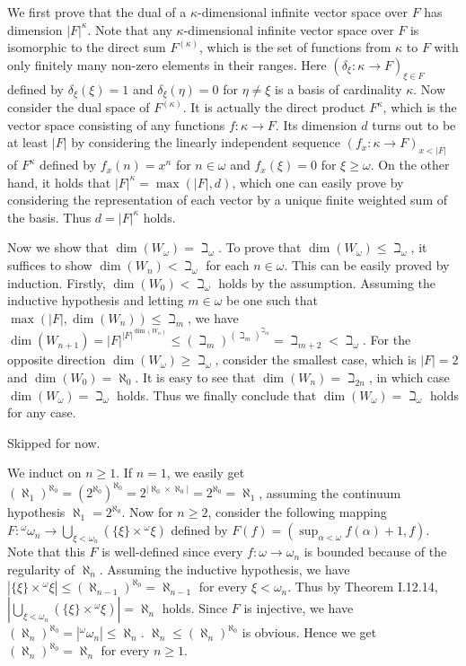 \documentclass[12pt]{article}
\theoremstyle{definition}
\newenvironment{customthm}[1]
  {\renewcommand\theinnercustomthm{#1}\innercustomthm}
  {\endinnercustomthm}
\begin{document}
\begin{customthm}{I.13.34}
  We first prove that the dual of a $\kappa$-dimensional infinite vector space over $F$ has dimension $|F|^\kappa$. Note that any $\kappa$-dimensional infinite vector space over $F$ is isomorphic to the direct sum $F^{(\kappa)}$, which is the set of functions from $\kappa$ to $F$ with only finitely many non-zero elements in their ranges. Here $(\delta_\xi:\kappa\rightarrow F)_{\xi\in F}$ defined by $\delta_\xi(\xi)=1$ and $\delta_\xi(\eta)=0$ for $\eta\neq\xi$ is a basis of cardinality $\kappa$. Now consider the dual space of $F^{(\kappa)}$. It is actually the direct product $F^\kappa$, which is the vector space consisting of any functions $f:\kappa\rightarrow F$. Its dimension $d$ turns out to be at least $|F|$ by considering the linearly independent sequence $(f_x:\kappa\rightarrow F)_{x<|F|}$ of $F^\kappa$ defined by $f_x(n)=x^n$ for $n\in\omega$ and $f_x(\xi)=0$ for $\xi\geq\omega$. On the other hand, it holds that $|F|^\kappa=\max(|F|,d)$, which one can easily prove by considering the representation of each vector by a unique finite weighted sum of the basis. Thus $d=|F|^\kappa$ holds.

  Now we show that $\dim(W_\omega)=\beth_\omega$. To prove that $\dim(W_\omega)\leq\beth_\omega$, it suffices to show $\dim(W_n)<\beth_\omega$ for each $n\in\omega$. This can be easily proved by induction. Firstly, $\dim(W_0)<\beth_\omega$ holds by the assumption. Assuming the inductive hypothesis and letting $m\in\omega$ be one such that $\max(|F|, \dim(W_n))\leq\beth_m$, we have $\dim(W_{n+1})=|F|^{|F|^{\dim(W_{n})}}\leq(\beth_m)^{(\beth_m)^{\beth_m}}=\beth_{m+2}<\beth_\omega$. For the opposite direction $\dim(W_\omega)\geq\beth_\omega$, consider the smallest case, which is $|F|=2$ and $\dim(W_0)=\aleph_0$. It is easy to see that $\dim(W_n)=\beth_{2n}$, in which case $\dim(W_\omega)=\beth_\omega$ holds. Thus we finally conclude that $\dim(W_\omega)=\beth_\omega$ holds for any case.
\end{customthm}

\begin{customthm}{I.13.35}
  Skipped for now.
\end{customthm}

\begin{customthm}{I.13.36}
  We induct on $n\geq1$. If $n=1$, we easily get $(\aleph_1)^{\aleph_0}=(2^{\aleph_0})^{\aleph_0}=2^{|\aleph_0\times\aleph_0|}=2^{\aleph_0}=\aleph_1$, assuming the continuum hypothesis $\aleph_1=2^{\aleph_0}$. Now for $n\geq2$, consider the following mapping $F:{}^\omega\omega_n\rightarrow\bigcup_{\xi<\omega_n}(\{\xi\}\times{}^\omega\xi)$ defined by $F(f)=(\sup_{\alpha<\omega}f(\alpha)+1,f)$. Note that this $F$ is well-defined since every $f:\omega\rightarrow\omega_n$ is bounded because of the regularity of $\aleph_n$. Assuming the inductive hypothesis, we have $|\{\xi\}\times{}^\omega\xi|\leq(\aleph_{n-1})^{\aleph_0}=\aleph_{n-1}$ for every $\xi<\omega_n$. Thus by Theorem I.12.14, $|\bigcup_{\xi<\omega_n}(\{\xi\}\times{}^\omega\xi)|=\aleph_n$ holds. Since $F$ is injective, we have $(\aleph_n)^{\aleph_0}=|{}^\omega\omega_n|\leq\aleph_n$. $\aleph_n\leq(\aleph_n)^{\aleph_0}$ is obvious. Hence we get $(\aleph_n)^{\aleph_0}=\aleph_n$ for every $n\geq1$.
\end{customthm}
\end{document}
